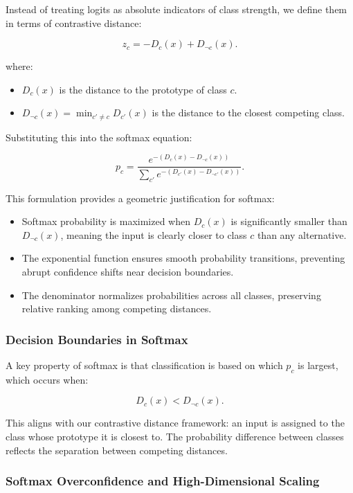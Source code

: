 Instead of treating logits as absolute indicators of class strength, we define them in terms of contrastive distance:

\[
z_c = -D_c(x) + D_{\neg c}(x).
\]

where:

\begin{itemize}
    \item \( D_c(x) \) is the distance to the prototype of class \( c \).
    \item \( D_{\neg c}(x) = \min_{c' \neq c} D_{c'}(x) \) is the distance to the closest competing class.
\end{itemize}

Substituting this into the softmax equation:

\[
p_c = \frac{e^{-(D_c(x) - D_{\neg c}(x))}}{\sum_{c'} e^{-(D_{c'}(x) - D_{\neg c'}(x))}}.
\]

This formulation provides a geometric justification for softmax:

\begin{itemize}
    \item Softmax probability is maximized when \( D_c(x) \) is significantly smaller than \( D_{\neg c}(x) \), meaning the input is clearly closer to class \( c \) than any alternative.
    \item The exponential function ensures smooth probability transitions, preventing abrupt confidence shifts near decision boundaries.
    \item The denominator normalizes probabilities across all classes, preserving relative ranking among competing distances.
\end{itemize}

\subsubsection{Decision Boundaries in Softmax}

A key property of softmax is that classification is based on which \( p_c \) is largest, which occurs when:

\[
D_c(x) < D_{\neg c}(x).
\]

This aligns with our contrastive distance framework: an input is assigned to the class whose prototype it is closest to. The probability difference between classes reflects the separation between competing distances.

\subsubsection{Softmax Overconfidence and High-Dimensional Scaling}

